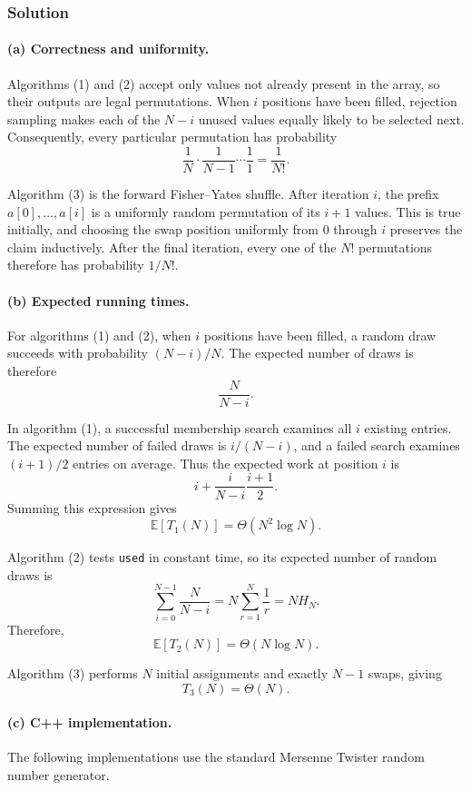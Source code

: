 \documentclass[12pt,a4paper]{article}
\begin{document}
\subsubsection*{\color{sectionnavy}Solution}

\paragraph{(a) Correctness and uniformity.}
Algorithms (1) and (2) accept only values not already present in the
array, so their outputs are legal permutations. When $i$ positions have
been filled, rejection sampling makes each of the $N-i$ unused values
equally likely to be selected next. Consequently, every particular
permutation has probability
\[
\frac1N\cdot\frac1{N-1}\cdots\frac11=\frac1{N!}.
\]

Algorithm (3) is the forward Fisher--Yates shuffle. After iteration $i$,
the prefix $a[0],\ldots,a[i]$ is a uniformly random permutation of its
$i+1$ values. This is true initially, and choosing the swap position
uniformly from $0$ through $i$ preserves the claim inductively. After
the final iteration, every one of the $N!$ permutations therefore has
probability $1/N!$.

\paragraph{(b) Expected running times.}
For algorithms (1) and (2), when $i$ positions have been filled, a
random draw succeeds with probability $(N-i)/N$. The expected number of
draws is therefore
\[
\frac{N}{N-i}.
\]

In algorithm (1), a successful membership search examines all $i$
existing entries. The expected number of failed draws is $i/(N-i)$,
and a failed search examines $(i+1)/2$ entries on average. Thus the
expected work at position $i$ is
\[
i+\frac{i}{N-i}\frac{i+1}{2}.
\]
Summing this expression gives
\[
\boxed{\mathbb{E}[T_1(N)]=\Theta(N^2\log N)}.
\]

Algorithm (2) tests \texttt{used} in constant time, so its expected
number of random draws is
\[
\sum_{i=0}^{N-1}\frac{N}{N-i}
=N\sum_{r=1}^{N}\frac1r
=NH_N.
\]
Therefore,
\[
\boxed{\mathbb{E}[T_2(N)]=\Theta(N\log N)}.
\]

Algorithm (3) performs $N$ initial assignments and exactly $N-1$
swaps, giving
\[
\boxed{T_3(N)=\Theta(N)}.
\]

\paragraph{(c) C++ implementation.}
The following implementations use the standard Mersenne Twister random
number generator.
\end{document}
